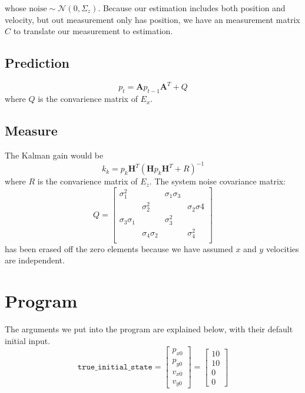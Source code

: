 \documentclass[12pt]{article}
\begin{document}
	whose $\text{noise}\sim\mathcal{N}\left(0,\Sigma_z\right)$. Because our estimation includes both position and velocity, but out measurement only has position, we have an measurement matrix $C$ to translate our measurement to estimation.

	\subsection{Prediction}\label{sub:predict}
	\begin{equation}
		p_t=\mathbf{A}p_{t-1}\mathbf{A}^T+Q
	\end{equation}
	where $Q$ is the convarience matrix of $E_x$.

	\subsection{Measure}\label{sub:measure}
	The Kalman gain would be
	\begin{equation}
		k_k=p_k\mathbf{H}^T{\left(\mathbf{H}p_k\mathbf{H}^T+R\right)}^{-1}
	\end{equation}
	where $R$ is the convarience matrix of $E_z$. The system noise covariance matrix:
	\begin{equation}
		Q=
		\begin{bmatrix}
			\sigma_1^2       &                  & \sigma_1\sigma_3 &                 \\
			                 & \sigma_2^2       &                  & \sigma_2\sigma4 \\
			\sigma_3\sigma_1 &                  & \sigma_3^2       &                 \\
			                 & \sigma_4\sigma_2 &                  & \sigma_4^2      \\
		\end{bmatrix}
	\end{equation}
	has been erased off the zero elements because we have assumed $x$ and $y$ velocities are independent.
	\section{Program}\label{sec:program}

	The arguments we put into the program are explained below, with their default initial input.
	\begin{equation}
		\mathtt{true\_initial\_state}=
		\begin{bmatrix}
			p_{x0} \\ p_{y0} \\ v_{x0} \\ v_{y0}
		\end{bmatrix}=
		\begin{bmatrix}
			10 \\ 10 \\ 0 \\ 0
		\end{bmatrix}
	\end{equation}
\end{document}
